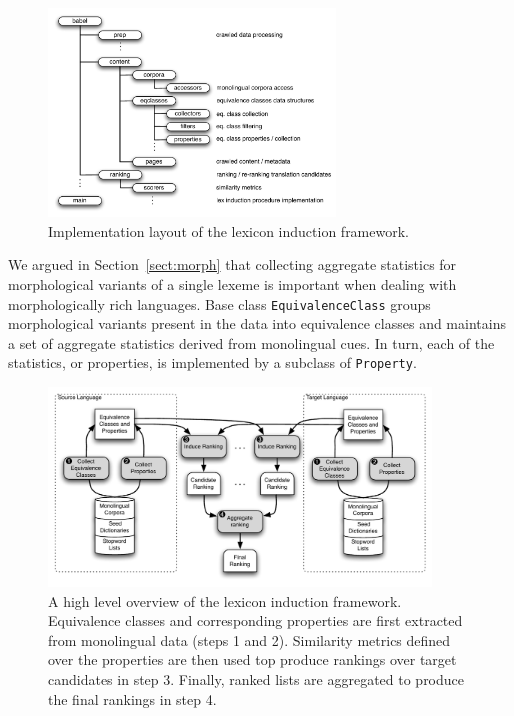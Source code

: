 \documentclass{article}
\newcommand{\secref}[1]{Section~\ref{#1}}
\begin{document}
\begin{figure}[h]
\centerline{\mbox{\includegraphics[width=3in]{figures/packages}}}
\caption{Implementation layout of the lexicon induction framework.}
\label{fig:packages}
\end{figure}

We argued in \secref{sect:morph} that collecting aggregate statistics for morphological variants of a single lexeme is important when dealing with morphologically rich languages.   Base class \small{\tt EquivalenceClass} groups morphological variants present in the data into equivalence classes and maintains a set of aggregate statistics derived from monolingual cues.  In turn, each of the statistics, or properties, is implemented by a subclass of \small{\tt Property}. \\

\begin{figure}[h!]
\centerline{\mbox{\includegraphics[width=4in]{figures/lexinduct}}}
\caption{A high level overview of the lexicon induction framework.  Equivalence classes and corresponding properties are first extracted from monolingual data (steps 1 and 2).  Similarity metrics defined over the properties are then used top produce rankings over target candidates in step 3.  Finally, ranked lists are aggregated to produce the final rankings in step 4.}
\label{fig:system}
\end{figure}
\end{document}
